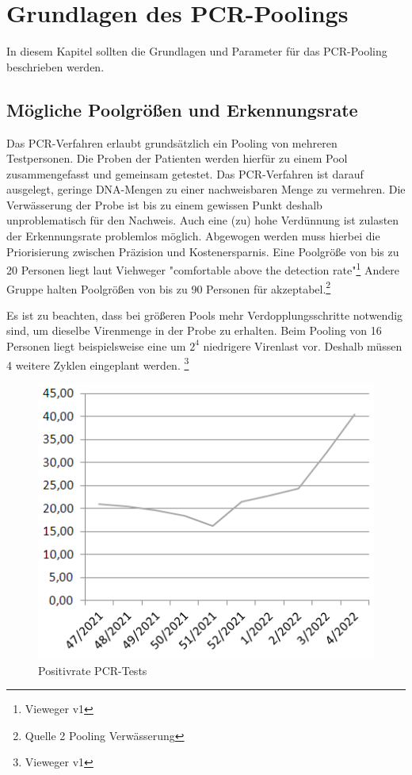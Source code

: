 \cleardoublepage
\chapter{Grundlagen des PCR-Poolings}
In diesem Kapitel sollten die Grundlagen und Parameter für das PCR-Pooling beschrieben werden.


\section{Mögliche Poolgrößen und Erkennungsrate}%
Das PCR-Verfahren erlaubt grundsätzlich ein Pooling von mehreren Testpersonen.
Die Proben der Patienten werden hierfür zu einem Pool zusammengefasst und gemeinsam getestet.
Das PCR-Verfahren ist darauf ausgelegt, geringe DNA-Mengen zu einer nachweisbaren Menge zu vermehren.
Die Verwässerung der Probe ist bis zu einem gewissen Punkt deshalb unproblematisch für den Nachweis.
Auch eine (zu) hohe Verdünnung ist zulasten der Erkennungsrate problemlos möglich.
Abgewogen werden muss hierbei die Priorisierung zwischen Präzision und Kostenersparnis.
Eine Poolgröße von bis zu 20 Personen liegt laut Viehweger "comfortable above the detection rate"\footnote{Vieweger v1}
Andere Gruppe halten Poolgrößen von bis zu 90 Personen für akzeptabel.\footnote{Quelle 2 Pooling Verwässerung}

Es ist zu beachten, dass bei größeren Pools mehr Verdopplungsschritte notwendig sind, um dieselbe Virenmenge in der Probe zu erhalten.
Beim Pooling von 16 Personen liegt beispielsweise eine um $2^{4}$ niedrigere Virenlast vor.
Deshalb müssen 4 weitere Zyklen eingeplant werden.
\footnote{Vieweger v1}


\begin{figure}
	\includegraphics[width=.5\textwidth]{img/RKI_PCR_Positivrate}
	\caption{Positivrate PCR-Tests\footnotemark}
\end{figure}

